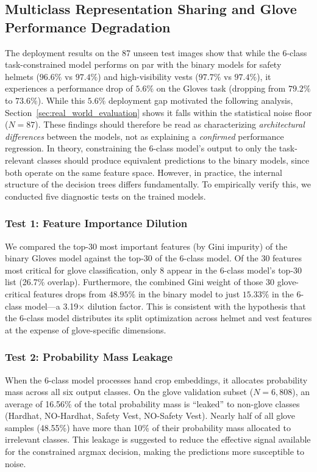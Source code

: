 \documentclass[11pt,a4paper]{article}
\begin{document}
\subsection{Multiclass Representation Sharing and Glove Performance Degradation}
\label{sec:multiclass_glove_degradation}
The deployment results on the 87 unseen test images show that while the 6-class task-constrained model performs on par with the binary models for safety helmets ($96.6\%$ vs $97.4\%$) and high-visibility vests ($97.7\%$ vs $97.4\%$), it experiences a performance drop of $5.6\%$ on the Gloves task (dropping from $79.2\%$ to $73.6\%$). While this $5.6\%$ deployment gap motivated the following analysis, Section~\ref{sec:real_world_evaluation} shows it falls within the statistical noise floor ($N=87$). These findings should therefore be read as characterizing \textit{architectural differences} between the models, not as explaining a \textit{confirmed} performance regression. In theory, constraining the 6-class model's output to only the task-relevant classes should produce equivalent predictions to the binary models, since both operate on the same feature space. However, in practice, the internal structure of the decision trees differs fundamentally. To empirically verify this, we conducted five diagnostic tests on the trained models.

\subsubsection{Test 1: Feature Importance Dilution}
We compared the top-30 most important features (by Gini impurity) of the binary Gloves model against the top-30 of the 6-class model. Of the 30 features most critical for glove classification, only 8 appear in the 6-class model's top-30 list (26.7\% overlap). Furthermore, the combined Gini weight of those 30 glove-critical features drops from $48.95\%$ in the binary model to just $15.33\%$ in the 6-class model—a 3.19$\times$ dilution factor. This is consistent with the hypothesis that the 6-class model distributes its split optimization across helmet and vest features at the expense of glove-specific dimensions.

\subsubsection{Test 2: Probability Mass Leakage}
When the 6-class model processes hand crop embeddings, it allocates probability mass across all six output classes. On the glove validation subset ($N = 6{,}808$), an average of 16.56\% of the total probability mass is ``leaked'' to non-glove classes (Hardhat, NO-Hardhat, Safety Vest, NO-Safety Vest). Nearly half of all glove samples (48.55\%) have more than 10\% of their probability mass allocated to irrelevant classes. This leakage is suggested to reduce the effective signal available for the constrained argmax decision, making the predictions more susceptible to noise.
\end{document}
